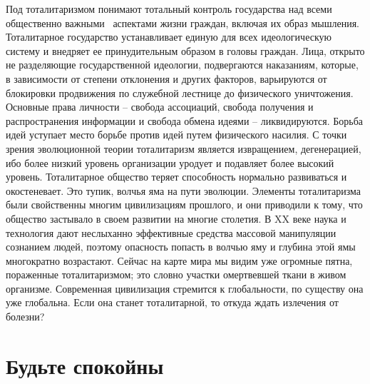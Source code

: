 \documentclass{book}
\begin{document}
Под тоталитаризмом понимают тотальный контроль государства над всеми общественно важными  аспектами жизни граждан, включая их образ мышления. Тоталитарное государ­ство устанавливает единую для всех идеологическую систему и внедряет ее принудительным образом в головы граждан. Лица, открыто не разделяющие государственной идеологии, подвергаются наказаниям, которые, в зависимости от степени отклонения и других факторов, варьируются от блокировки продвижения по служебной лестнице до физического уничтожения. Основные права личности -- свобода ассоциаций, свобода получения и распространения информации и свобода обмена идеями -- ликвидируются. Борьба идей уступает место борьбе против  идей путем физического насилия. С точки зрения эволюционной теории тоталитаризм является извращением, дегенерацией, ибо более низкий уровень организации уродует и подавляет более высокий уровень. Тоталитарное общество теряет способность нормально развиваться и око­стеневает. Это тупик, волчья яма на пути эволюции.
Элементы тоталитаризма были свойственны многим циви­лизациям прошлого, и они приводили к тому, что общество застывало в своем 
развитии на многие столетия. В XX веке наука и технология дают неслыханно эффективные средства массовой манипуляции сознанием 
людей, поэтому опасность попасть в волчью яму и глубина этой ямы многократно возрастают. Сейчас на карте мира мы видим уже 
огромные пятна, пораженные тоталитаризмом; это словно участки омертвевшей ткани в живом организме. Современная цивилизация 
стремится к глобальности, по существу она уже глобальна. Если она станет тоталитарной, то откуда ждать излечения от болезни?


\section{Будьте спокойны}
\end{document}
